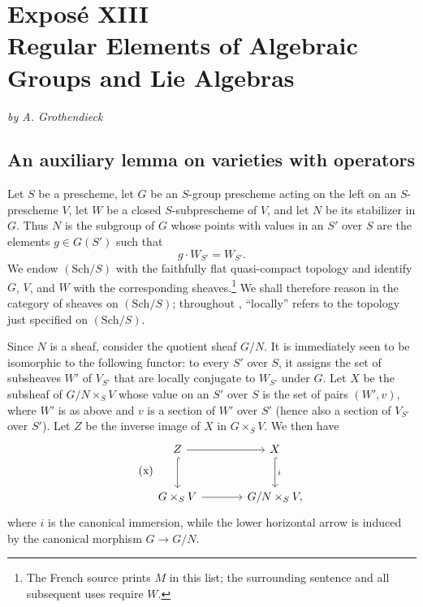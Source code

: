 

\chapter*{Exposé XIII\\Regular Elements of Algebraic Groups and Lie Algebras}

\begin{center}
\textit{by A. Grothendieck}
\end{center}

\section{An auxiliary lemma on varieties with operators}

Let \(S\) be a prescheme, let \(G\) be an \(S\)-group prescheme acting
on the left on an \(S\)-prescheme \(V\), let \(W\) be a closed
\(S\)-subprescheme of \(V\), and let \(N\) be its stabilizer in \(G\).
Thus \(N\) is the subgroup of \(G\) whose points with values in an
\(S'\) over \(S\) are the elements \(g\in G(S')\) such that
\[
  g\cdot W_{S'}=W_{S'}.
\]
We endow \((\mathrm{Sch}/S)\) with the faithfully flat
quasi-compact topology and identify \(G\), \(V\), and \(W\) with the
corresponding sheaves.\footnote{The French source prints \(M\) in this
list; the surrounding sentence and all subsequent uses require \(W\).}
We shall therefore reason in the category of sheaves on
\((\mathrm{Sch}/S)\); throughout , ``locally'' refers to
the topology just specified on \((\mathrm{Sch}/S)\).

Since \(N\) is a sheaf, consider the quotient sheaf \(G/N\). It is
immediately seen to be isomorphic to the following functor: to every
\(S'\) over \(S\), it assigns the set of subsheaves \(W'\) of
\(V_{S'}\) that are locally conjugate to \(W_{S'}\) under \(G\).
Let \(X\) be the subsheaf of \(G/N\times_S V\) whose value on an
\(S'\) over \(S\) is the set of pairs \((W',v)\), where \(W'\) is as
above and \(v\) is a section of \(W'\) over \(S'\) (hence also a
section of \(V_{S'}\) over \(S'\)). Let \(Z\) be the inverse image of
\(X\) in \(G\times_S V\). We then have 
\[
\tag{x}\label{sga3:xiii:equation:x}
\begin{tikzcd}[column sep=large,row sep=large]
Z \arrow[r] \arrow[d,hook] & X \arrow[d,hook,"i"] \\
G\times_S V \arrow[r] & G/N\times_S V ,
\end{tikzcd}
\]
where \(i\) is the canonical immersion, while the lower horizontal
arrow is induced by the canonical morphism \(G\to G/N\).

